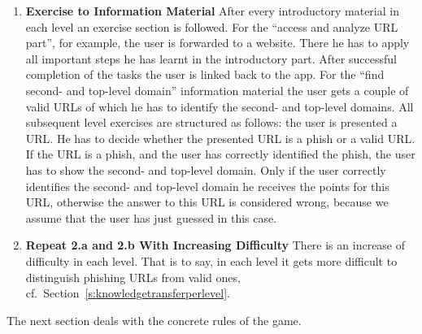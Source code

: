 \begin{enumerate}
\begin{enumerate}
		\item \textbf{Exercise to Information Material} After every introductory material in each level an exercise section is followed. For the ``access and analyze URL part'', for example, the user is forwarded to a website. There he has to apply all important steps he has learnt in the introductory part. After successful completion of the tasks the user is linked back to the app. For the ``find second- and top-level domain'' information material the user gets a couple of valid URLs of which he has to identify the second- and top-level domains. All subsequent level exercises are structured as follows: the user is presented a URL. He has to decide whether the presented URL is a phish or a valid URL. If the URL is a phish, and the user has correctly identified the phish, the user has to show the second- and top-level domain. Only if the user correctly identifies the second- and top-level domain he receives the points for this URL, otherwise the answer to this URL is considered wrong, because we assume that the user has just guessed in this case.
		\item \textbf{Repeat 2.a and 2.b With Increasing Difficulty} There is an increase of difficulty in each level. That is to say, in each level it gets more difficult to distinguish phishing URLs from valid ones, cf.~Section~\ref{s:knowledgetransferperlevel}.
	\end{enumerate}
\end{enumerate}

The next section deals with the concrete rules of the game.
